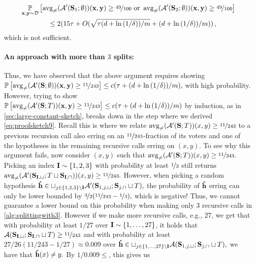 \begin{align*}
&\operatorname*{\mathbb{P}}_{\mathbf{x},\mathbf{y}\sim \mathcal{D}}\left[\operatorname{\mathrm{avg}_{\not=}}( \mathcal{A}'(\mathbf{S}_{1};\emptyset))(\mathbf{x},\mathbf{y})\geq \nicefrac{49}{100}\text{ or } \operatorname{\mathrm{avg}_{\not=}}( \mathcal{A}'(\mathbf{S}_{2};\emptyset))(\mathbf{x},\mathbf{y})\geq \nicefrac{49}{100}\right]  \\
& \qquad \qquad \leq 2(15\tau +O(\sqrt{\tau(d+\ln{\left(1/\delta \right)})/m}+(d+\ln{\left(1/\delta \right)})/m)) \,,
 \end{align*}
 which is not sufficient.


{}
 
\paragraph{An approach with more than $ 3 $ splits:}
Thus, we have observed that the above argument requires showing $ \operatorname*{\mathbb{P}}\left[\operatorname{\mathrm{avg}_{\not=}}( \mathcal{A}'(\mathbf{S};\emptyset))(\mathbf{x},\mathbf{y})\geq \nicefrac{11}{243}\right]\leq c(\tau +(d+\ln{\left(1/\delta \right)})/m),$ with high probability.
However, trying to show $ \operatorname*{\mathbb{P}}\left[\operatorname{\mathrm{avg}_{\not=}}( \mathcal{A}'(\mathbf{S};T))(\mathbf{x},\mathbf{y})\geq \nicefrac{11}{243}\right]\leq c(\tau +(d+\ln{\left(1/\delta \right)})/m)$ by induction, as in \cref{sec:large-constant-sketch}, breaks down in the step where we derived \cref{eq:proofsketch9}. Recall this is where  we  relate $\operatorname{\mathrm{avg}_{\not=}}( \mathcal{A}'(\mathbf{S};T))(x,y)\geq \nicefrac{11}{243} $ to a previous recursion call also erring on an $ \nicefrac{11}{243} $-fraction of its voters and one of the hypotheses in the remaining recursive calls erring on $ (x,y) $. 
To see why this argument fails, now consider $ (x,y) $ such that $\operatorname{\mathrm{avg}_{\not=}}( \mathcal{A}'(\mathbf{S};T))(x,y)\geq \nicefrac{11}{243}.$ Picking an index $ \mathbf{I}\sim \left\{  1,2,3\right\}  $ with probability at least $ \nicefrac{1}{3} $ still returns  $\operatorname{\mathrm{avg}_{\not=}}( \mathcal{A}'(\mathbf{S}_{\mathbf{I},\sqcup};T\sqcup \mathbf{S}_{\mathbf{I},\sqcap}))(x,y)\geq \nicefrac{11}{243}.$ However, when picking a random hypothesis $\mathbf{\hat{h}}\in \sqcup_{j\in\{  1,2,3\}\backslash \mathbf{I} } \mathcal{A}'(\mathbf{S}_{1,j,\sqcup};\mathbf{S}_{j,\sqcap}\sqcup T),$ the probability of $ \mathbf{\hat{h}} $ erring can only be lower bounded by $ \nicefrac{3}{2}(\nicefrac{11}{243}-\nicefrac{1}{3}),$ which is negative!
Thus, we cannot guarantee a lower bound on this probability when making only $ 3 $ recursive calls in \cref{alg:splittingwith3}.
However if we make more recursive calls, e.g., $ 27 $, we get that with probability at least $ 1/27 $ over $ \mathbf{I}\sim \left\{  1,\ldots,27\right\}  $, it holds that $ \mathcal{A}(\mathbf{S}_{\mathbf{I},\sqcup};\mathbf{S}_{\mathbf{I},\sqcap}\sqcup T) \geq \nicefrac{11}{243}$ and with probability at least $ 27/26(11/243-1/27)\approx0.009 $ over  $\mathbf{\hat{h}}\in \sqcup_{j\in\{  1,\ldots,27\}\backslash \mathbf{I} } \mathcal{A}(\mathbf{S}_{1,j,\sqcup};\mathbf{S}_{j,\sqcap}\sqcup T),$ we have that $\mathbf{\hat{h}}(x)\not=y.$ By $1/0.009 \leq $, this gives us 
